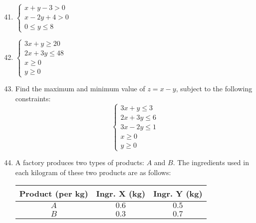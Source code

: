 \documentclass{report}
\begin{document}
\begin{multicols}{2}
    \begin{enumerate}
        \setcounter{enumi}{40}
        \item $\begin{cases}
                      x + y - 3 > 0  \\
                      x - 2y + 4 > 0 \\
                      0 \leq y \leq 8
                  \end{cases}$
        \item $\begin{cases}
                      3x + y \geq 20  \\
                      2x + 3y \leq 48 \\
                      x \geq 0        \\
                      y \geq 0
                  \end{cases}$
    \end{enumerate}

    \begin{enumerate}
        \setcounter{enumi}{42}
        \item Find the maximum and minimum value of $z = x - y$, subject to the following
              constraints: \[\begin{cases}
                      3x + y \leq 3  \\
                      2x + 3y \leq 6 \\
                      3x - 2y \leq 1 \\
                      x \geq 0       \\
                      y \geq 0
                  \end{cases}\]

        \item A factory produces two types of products: $A$ and $B$. The ingredients used in
              each kilogram of these two products are as follows:

              \begin{center}
                  \begin{tabular}{|c|c|c|}
                      \hline
                      \textbf{Product (per kg)} & \textbf{Ingr. X (kg)} & \textbf{Ingr. Y (kg)} \\
                      \hline
                      $A$                       & $0.6$                 & $0.5$                 \\
                      $B$                       & $0.3$                 & $0.7$                 \\
                      \hline
                  \end{tabular}
              \end{center}


\end{enumerate}
\end{multicols}
\end{document}
